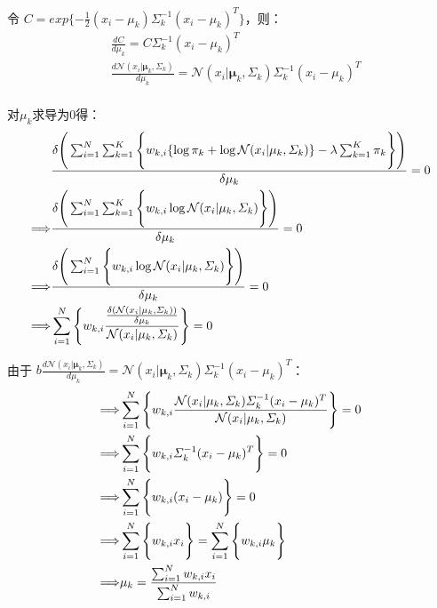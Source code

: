 令 $C=exp\{-\frac{1}{2}(x_i-\mu_k)\varSigma_k^{-1}(x_i-\mu_k)^T\}$，则：
\begin{displaymath}
\begin{split}
&\frac{dC}{d\mu_k} = C \varSigma_k^{-1}(x_i-\mu_k)^T\\
&\frac{d \mathcal{N}(x_{i}|\mathbf{\mu}_k,\mathbf{\varSigma}_k)}{d\mu_k} = \mathcal{N}(x_{i}|\mathbf{\mu}_k,\mathbf{\varSigma}_k) \varSigma_k^{-1}(x_i-\mu_k)^T\\
\end{split}
\end{displaymath}



对$\mu_k$求导为0得：
\begin{displaymath}
\begin{split}
&\frac{
\delta{ \Bigg{(}
\sum_{i=1}^{N} \sum_{k=1}^{K} 
\Bigg{\{}
w_{k,i} \{ 
\log{\pi_k} + \log{\mathcal{N}(x_{i}|\mu_k,\varSigma_k)} 
\}
-\lambda \sum_{k=1}^{K}{\pi_k} \Bigg{\}} \Bigg{)}
}}{\delta{\mu_k}} = 0\\
\Longrightarrow& \frac{
\delta{ \Bigg{(}
\sum_{i=1}^{N} \sum_{k=1}^{K} 
\Bigg{\{}
w_{k,i} \log{\mathcal{N}(x_{i}|\mu_k,\varSigma_k)} 
\Bigg{\}} \Bigg{)}
}}{\delta{\mu_k}} = 0\\
\Longrightarrow& \frac{
\delta{ \Bigg{(}
\sum_{i=1}^{N}
\Bigg{\{}
w_{k,i} \log{\mathcal{N}(x_{i}|\mu_k,\varSigma_k)} 
\Bigg{\}} \Bigg{)}
}}{\delta{\mu_k}} = 0\\
\Longrightarrow& 
\sum_{i=1}^{N}
\Bigg{\{}
w_{k,i} 
\frac{
      \frac{
           \delta(  \mathcal{N}(x_{i}|\mu_k,\varSigma_k)  )
           }{\delta{\mu_k}}
}
{\mathcal{N}(x_{i}|\mu_k,\varSigma_k)} 
\Bigg{\}}
 = 0\\
\end{split}
\end{displaymath}

由于 $b\frac{d
  \mathcal{N}(x_{i}|\mathbf{\mu}_k,\mathbf{\varSigma}_k)}{d\mu_k} =
\mathcal{N}(x_{i}|\mathbf{\mu}_k,\mathbf{\varSigma}_k)
\varSigma_k^{-1}(x_i-\mu_k)^T$：
\begin{displaymath}
\begin{split}
\Longrightarrow& 
\sum_{i=1}^{N}
\Bigg{\{}
w_{k,i} 
\frac{
 \mathcal{N}(x_{i}|\mathbf{\mu}_k,\mathbf{\varSigma}_k) \varSigma_k^{-1}(x_i-\mu_k)^T
}
{\mathcal{N}(x_{i}|\mu_k,\varSigma_k)} 
\Bigg{\}}
 = 0\\
\Longrightarrow& 
\sum_{i=1}^{N}
\Bigg{\{}
w_{k,i}  \varSigma_k^{-1}(x_i-\mu_k)^T
\Bigg{\}}
 = 0\\
\Longrightarrow& 
\sum_{i=1}^{N}
\Bigg{\{}
w_{k,i}(x_i-\mu_k)
\Bigg{\}}
 = 0\\
\Longrightarrow& 
\sum_{i=1}^{N}
\Bigg{\{}
w_{k,i}x_i
\Bigg{\}}
 = \sum_{i=1}^{N}
\Bigg{\{}
w_{k,i}\mu_k
\Bigg{\}}\\
\Longrightarrow& 
\mu_k = \frac{
\sum_{i=1}^{N}  w_{k,i}x_i 
}{ 
\sum_{i=1}^{N} w_{k,i}
}\\
\end{split}
\end{displaymath}



